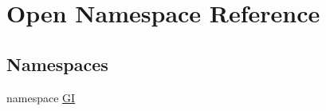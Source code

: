 \hypertarget{namespace_open}{}\section{Open Namespace Reference}
\label{namespace_open}
\subsection*{Namespaces}
\begin{DoxyCompactItemize}
\item 
namespace \hyperlink{namespace_open_1_1_g_i}{G\+I}
\end{DoxyCompactItemize}

